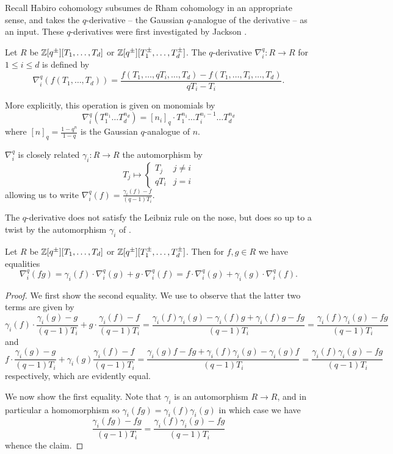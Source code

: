 Recall Habiro cohomology subsumes de Rham cohomology in an appropriate sense, and takes the $q$-derivative -- the Gaussian $q$-analogue of the derivative -- as an input. These $q$-derivatives were first investigated by Jackson \cite{Jackson}.
\begin{definition}[$q$-Derivative]\label{def: q-derivative}
    Let $R$ be $\mathbb{Z}[q^{\pm}][T_{1},\dots,T_{d}]$ or $\mathbb{Z}[q^{\pm}][T_{1}^{\pm},\dots,T_{d}^{\pm}]$. The $q$-derivative $\nabla_{i}^{q}:R\to R$ for $1\leq i\leq d$ is defined by 
    $$\nabla_{i}^{q}(f(T_{1},\dots,T_{d}))=\frac{f(T_{1},\dots,qT_{i},\dots,T_{d})-f(T_{1},\dots,T_{i},\dots,T_{d})}{qT_{i}-T_{i}}.$$
\end{definition}
\begin{remark}
    More explicitly, this operation is given on monomials by 
    $$\nabla_{i}^{q}(T_{1}^{n_{1}}\dots T_{d}^{n_{d}})=[n_{i}]_{q}\cdot T_{1}^{n_{1}}\dots T_{i}^{n_{i}-1}\dots T_{d}^{n_{d}}$$
    where $[n]_{q}=\frac{1-q^{n}}{1-q}$ is the Gaussian $q$-analogue of $n$. 
\end{remark}
\begin{remark}\label{rmk: gamma i maps}
    $\nabla_{i}^{q}$ is closely related $\gamma_{i}:R\to R$ the automorphism by 
    $$T_{j}\mapsto\begin{cases}
        T_{j} & j\neq i \\
        qT_{i} & j=i
    \end{cases}$$
    allowing us to write $\nabla_{i}^{q}(f)=\frac{\gamma_{i}(f)-f}{(q-1)T_{i}}$. 
\end{remark}
The $q$-derivative does not satisfy the Leibniz rule on the nose, but does so up to a twist by the automorphism $\gamma_{i}$ of . 
\begin{lemma}\label{lem: twisted q-leibniz}
    Let $R$ be $\mathbb{Z}[q^{\pm}][T_{1},\dots,T_{d}]$ or $\mathbb{Z}[q^{\pm}][T_{1}^{\pm},\dots,T_{d}^{\pm}]$. Then for $f,g\in R$ we have equalities 
    $$\nabla_{i}^{q}(fg)=\gamma_{i}(f)\cdot\nabla_{i}^{q}(g)+g\cdot\nabla_{i}^{q}(f)=f\cdot\nabla_{i}^{q}(g)+\gamma_{i}(g)\cdot\nabla^{q}_{i}(f).$$
\end{lemma}
\begin{proof}
    We first show the second equality. We use  to observe that the latter two terms are given by 
    $$\gamma_{i}(f)\cdot\frac{\gamma_{i}(g)-g}{(q-1)T_{i}}+g\cdot\frac{\gamma_{i}(f)-f}{(q-1)T_{i}}=\frac{\gamma_{i}(f)\gamma_{i}(g)-\gamma_{i}(f)g+\gamma_{i}(f)g-fg}{(q-1)T_{i}}=\frac{\gamma_{i}(f)\gamma_{i}(g)-fg}{(q-1)T_{i}}$$
    and 
    $$f\cdot\frac{\gamma_{i}(g)-g}{(q-1)T_{i}}+\gamma_{i}(g)\frac{\gamma_{i}(f)-f}{(q-1)T_{i}}=\frac{\gamma_{i}(g)f-fg+\gamma_{i}(f)\gamma_{i}(g)-\gamma_{i}(g)f}{(q-1)T_{i}}=\frac{\gamma_{i}(f)\gamma_{i}(g)-fg}{(q-1)T_{i}}$$
    respectively, which are evidently equal. 

    We now show the first equality. Note that $\gamma_{i}$ is an automorphism $R\to R$, and in particular a homomorphism so $\gamma_{i}(fg)=\gamma_{i}(f)\gamma_{i}(g)$ in which case we have 
    $$\frac{\gamma_{i}(fg)-fg}{(q-1)T_{i}}=\frac{\gamma_{i}(f)\gamma_{i}(g)-fg}{(q-1)T_{i}}$$
    whence the claim. 
\end{proof}
